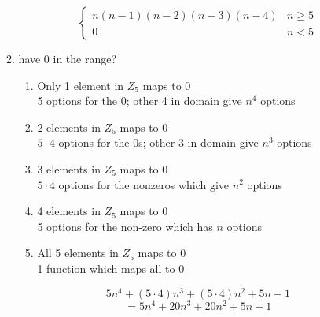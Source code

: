 \documentclass[letterpaper, 12pt]{article}
\newcommand{\0}{\emptyset}
\begin{document}
\begin{enumerate}
\begin{enumerate}
\[\begin{cases}
    n(n-1)(n-2)(n-3)(n-4) & n \ge 5 \\
    0 & n < 5
\end{cases}\]
\item have 0 in the range?
\begin{enumerate}
    \item Only 1 element in $Z_5$ maps to 0 \\
    5 options for the 0; other 4 in domain give $n^4$ options
    \item 2 elements in $Z_5$ maps to 0 \\
    $5 \cdot 4$ options for the 0s; other 3 in domain give $n^3$ options
    \item 3 elements in $Z_5$ maps to 0 \\
    $5 \cdot 4$ options for the nonzeros which give $n^2$ options
    \item 4 elements in $Z_5$ maps to 0 \\
    5 options for the non-zero which has $n$ options
    \item All 5 elements in $Z_5$ maps to 0 \\
    1 function which maps all to 0
\end{enumerate}
\[5n^4 + (5 \cdot 4)n^3 + (5 \cdot 4)n^2 + 5n + 1\]
\[= 5n^4 + 20n^3 + 20n^2 + 5n + 1\]
\end{enumerate}
\end{enumerate}
\end{document}
